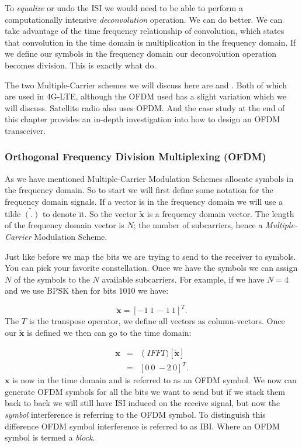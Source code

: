 To \emph{equalize} or undo the \ac{ISI} we would need to be able to perform a computationally intensive \emph{deconvolution} operation. We can do better. We can take advantage of the time frequency relationship of convolution, which states that convolution in the time domain is multiplication in the frequency domain. If we define our symbols in the frequency domain our deconvolution operation becomes division. This is exactly what  do.

The two Multiple-Carrier schemes we will discuss here are  and . Both of which are used in \ac{4G-LTE}, although the \ac{OFDM} used has a slight variation which we will discuss. Satellite radio also uses \ac{OFDM}. And the case study at the end of this chapter provides an in-depth investigation into how to design an \ac{OFDM} transceiver.

\subsubsection{Orthogonal Frequency Division Multiplexing (OFDM)}

As we have mentioned Multiple-Carrier Modulation Schemes allocate symbols in the frequency domain. So to start we will first define some notation for the frequency domain signals. If a vector is in the frequency domain we will use a tilde $\tilde{(.)}$ to denote it. So the vector $\tilde{\mathbf{x}}$ is a frequency domain vector. The length of the frequency domain vector is $N$; the number of subcarriers, hence a \emph{Multiple-Carrier} Modulation Scheme.

Just like before we map the bits we are trying to send to the receiver to symbols. You can pick your favorite constellation. Once we have the symbols we can assign $N$ of the symbols to the $N$ available subcarriers. For example, if we have $N=4$ and we use \ac{BPSK} then for bits $1010$ we have:

\begin{equation}
\label{eq:subcar}
\tilde{\mathbf{x}} = [-1~1~-1~1]^T.
\end{equation} 
\noindent
The $T$ is the transpose operator, we define all vectors as column-vectors. Once our $\tilde{\mathbf{x}}$ is defined we then can go to the time domain:

\begin{eqnarray}
\mathbf{x} &=& \operatorname(IFFT)\left[\tilde{\mathbf{x}}\right]\\
&=& [0~0~-2~0]^T.
\label{eq:ofdmtime}
\end{eqnarray}
\noindent
$\mathbf{x}$ is now in the time domain and is referred to as an \ac{OFDM} symbol. We now can generate \ac{OFDM} symbols for all the bits we want to send but if we stack them back to back we will still have \ac{ISI} induced on the receive signal, but now the \emph{symbol} interference is referring to the \ac{OFDM} symbol. To distinguish this difference \ac{OFDM} symbol interference is referred to as \ac{IBI}. Where an \ac{OFDM} symbol is termed a \emph{block}.

